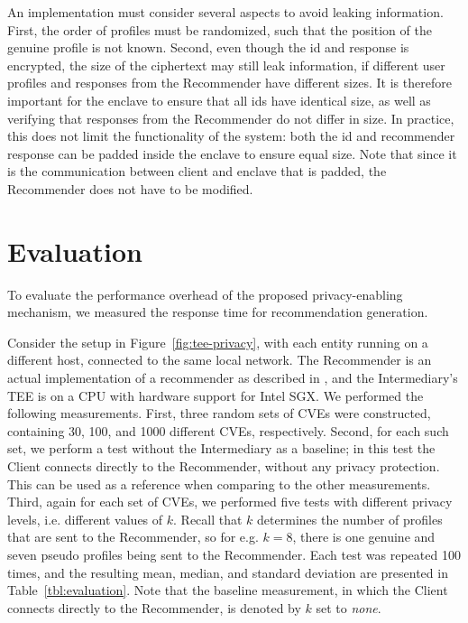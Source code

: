 {An implementation must consider several aspects to avoid leaking information.
First, the order of profiles must be randomized, such that the position of the genuine profile is not known.
Second, even though the id and response is encrypted, the size of the ciphertext may still leak information, if different user profiles and responses from the Recommender have different sizes.
It is therefore important for the enclave to ensure that all ids have identical size, as well as verifying that responses from the Recommender do not differ in size.
In practice, this does not limit the functionality of the system: both the id and recommender response can be padded inside the enclave to ensure equal size.
Note that since it is the communication between client and enclave that is padded, the Recommender does not have to be modified.

\section{Evaluation}
\label{sec:recsyssgx:evaluation}
To evaluate the performance overhead of the proposed privacy-enabling mechanism, we measured the response time for recommendation generation.

Consider the setup in Figure~\ref{fig:tee-privacy}, with each entity running on a different host, connected to the same local network.
The Recommender is an actual implementation of a recommender as described in \cite{cobleigh:2018}, and the Intermediary's TEE is on a CPU with hardware support for Intel SGX.
We performed the following measurements.
First, three random sets of CVEs were constructed, containing 30, 100, and 1000 different CVEs, respectively.
Second, for each such set, we perform a test without the Intermediary as a baseline; 
in this test the Client connects directly to the Recommender, without any privacy protection.
This can be used as a reference when comparing to the other measurements.
Third, again for each set of CVEs, we performed five tests with different privacy levels, i.e. different values of $k$.
Recall that $k$ determines the number of profiles that are sent to the Recommender, so for e.g. $k=8$, there is one genuine and seven pseudo profiles being sent to the Recommender.
Each test was repeated 100 times, and the resulting mean, median, and standard deviation are presented in Table~\ref{tbl:evaluation}.
Note that the baseline measurement, in which the Client connects directly to the Recommender, is denoted by $k$ set to \emph{none}.



}
